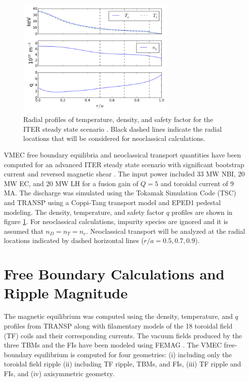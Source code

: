 \documentclass{article}
\begin{document}
\FloatBarrier

\begin{figure}[h!]
\centering
\includegraphics[width=0.7\textwidth]{profiles.png}
\caption{\label{fig:profiles} Radial profiles of temperature, density, and safety factor for the ITER steady state scenario \cite{Poli2014}. Black dashed lines indicate the radial locations that will be considered for neoclassical calculations.}
\end{figure}

VMEC free boundary equilibria and neoclassical transport quantities have been computed for an advanced ITER steady state scenario with significant bootstrap current and reversed magnetic shear \cite{Poli2014}. The input power included 33 MW NBI, 20 MW EC, and 20 MW LH for a fusion gain of $Q = 5$ and toroidal current of 9 MA. The discharge was simulated using the Tokamak Simulation Code (TSC) \cite{Jardin1986} and TRANSP \cite{Hawryluk1980} using a Coppi-Tang transport model and EPED1 \cite{Snyder2011} pedestal modeling. The density, temperature, and safety factor $q$ profiles are shown in figure \ref{fig:profiles}. For neoclassical calculations, impurity species are ignored and it is assumed that $n_D = n_T = n_e$. Neoclassical transport will be analyzed at the radial locations indicated by dashed horizontal lines ($r/a = 0.5, 0.7, 0.9$). 

\FloatBarrier

\section{Free Boundary Calculations and Ripple Magnitude} \label{vmec}

The magnetic equilibrium was computed using the density, temperature, and $q$ profiles from TRANSP along with filamentary models of the 18 toroidal field (TF) coils and their corresponding currents. The vacuum fields produced by the three TBMs and the FIs have been modeled using FEMAG \cite{Shinohara2009}. The VMEC free-boundary equilibrium \cite{Hirshman1986} is computed for four geometries: (i) including only the toroidal field ripple (ii) including TF ripple, TBMs, and FIs, (iii) TF ripple and FIs, and (iv) axisymmetric geometry.  
\end{document}
